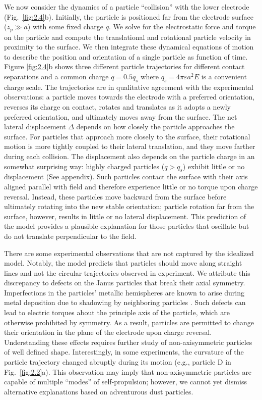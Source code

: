 We now consider the dynamics of a particle ``collision'' with the lower electrode (Fig.~\ref{fig:2.4}b). 
Initially, the particle is positioned far from the electrode surface ($z_p\gg a$) with some fixed charge $q$. 
We solve for the electrostatic force and torque on the particle and compute the translational and rotational particle velocity in proximity to the surface.
We then integrate these dynamical equations of motion to describe the position and orientation of a single particle as function of time.
Figure \ref{fig:2.4}b shows three different particle trajectories for different contact separations and a common charge $q = 0.5 q_s$ where $q_s = 4\pi\varepsilon a^2 E$ is a convenient charge scale.
The trajectories are in qualitative agreement with the experimental observations: a particle moves towards the electrode with a preferred orientation, reverses its charge on contact, rotates and translates as it adopts a newly preferred orientation, and ultimately moves away from the surface.
The net lateral displacement $\Delta$ depends on how closely the particle approaches the surface.
For particles that approach more closely to the surface, their rotational motion is more tightly coupled to their lateral translation, and they move farther during each collision.
The displacement also depends on the particle charge in an somewhat surprising way: highly charged particles ($q > q_s$) exhibit little or no displacement (See appendix).
Such particles contact the surface with their axis aligned parallel with field and therefore experience little or no torque upon charge reversal.
Instead, these particles move backward from the surface before ultimately rotating into the new stable orientation; particle rotation far from the surface, however, results in little or no lateral displacement.
This prediction of the model provides a plausible explanation for those particles that oscillate but do not translate perpendicular to the field.

There are some experimental observations that are not captured by the idealized model.
Notably, the model predicts that particles should move along straight lines and not the circular trajectories observed in experiment.
We attribute this discrepancy to defects on the Janus particles that break their axial symmetry.
Imperfections in the particles' metallic hemispheres are known to arise during metal deposition due to shadowing by neighboring particles \autocite{Pawar2008}.
Such defects can lead to electric torques about the principle axis of the particle, which are otherwise prohibited by symmetry.
As a result, particles are permitted to change their orientation in the plane of the electrode upon charge reversal.
Understanding these effects requires further study of non-axisymmetric particles of well defined shape.
Interestingly, in some experiments, the curvature of the particle trajectory changed abruptly during its motion (e.g., particle D in Fig.~\ref{fig:2.2}a). 
This observation may imply that non-axisymmetric particles are capable of multiple ``modes'' of self-propulsion; however, we cannot yet dismiss alternative explanations based on adventurous dust particles.

